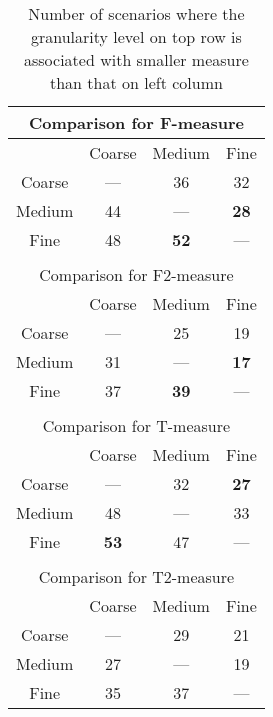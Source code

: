 \documentclass[10pt,journal,compsoc]{IEEEtran}
\begin{document}

\begin{table}
\caption{Number of scenarios where the granularity level on top row is associated with smaller measure than that on left column}
\label{tab:Gsta}
\centering
\begin{tabular}{|c|c|c|c|}
\multicolumn{4}{c}{Comparison for F-measure} \\ \hline
		& Coarse			& Medium			    & Fine				\\ \hline
Coarse	& ---				& 36					& 32				\\ \hline
Medium	& 44				& ---					& \textbf{28}	    \\ \hline
Fine	& 48			    & \textbf{52}	        & ---				\\ \hline
\multicolumn{4}{c}{ } \\
\multicolumn{4}{c}{Comparison for F2-measure} \\ \hline
				& Coarse			& Medium			& Fine				    \\ \hline
Coarse	& ---					& 25					& 19					\\ \hline
Medium	& 31					& ---					& \textbf{17}	        \\ \hline
Fine	& 37					& \textbf{39}	        & ---					\\ \hline
\multicolumn{4}{c}{ } \\
\multicolumn{4}{c}{Comparison for T-measure} \\ \hline
		& Coarse			& Medium			& Fine				  \\ \hline
Coarse	& ---				& 32				& \textbf{27}	      \\ \hline
Medium	& 48				& ---				& 33					\\ \hline
Fine		& \textbf{53}	& 47				& ---					\\ \hline
\multicolumn{4}{c}{ } \\
\multicolumn{4}{c}{Comparison for T2-measure} \\ \hline
				& Coarse			& Medium			& Fine				\\ \hline
Coarse	& ---					& 29					& 21					\\ \hline
Medium	& 27					& ---					& 19					\\ \hline
Fine		& 35					& 37					& ---					\\ \hline
\end{tabular}
\end{table}
\end{document}
